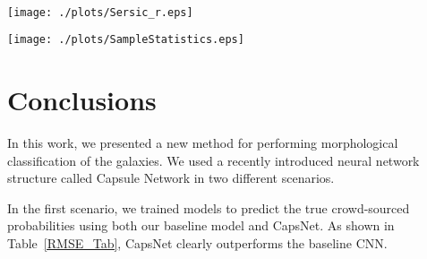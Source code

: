 \documentclass[a4paper,fleqn,usenatbib]{mnras}
\begin{document}
\begin{figure*}
	\centering
 	\hfil 
    \caption{Training and testing accuracy vs number of epochs for classification based on the answers to question one.}
    \label{fig_3_acc}
\end{figure*}

\begin{figure*}
	\centering
 	\hfil 
 	\\[-2ex]  
 	\hfill
 \caption{Original and reconstructed images of the galaxies.}
 \label{Reconst}
\end{figure*}

\begin{figure*}
	\centering
 	\texttt{[image: ./plots/Sersic\_r.eps]} 
    \caption{Estimated S{\'e}rsic index of original images versus reconstructed images.}
    \label{fig_S{\'e}rsic}
\end{figure*}

\begin{figure*}
	\centering
 	\texttt{[image: ./plots/SampleStatistics.eps]} 
    \caption{Mean and 95\% confidence interval of the difference between the estimated S{\'e}rsic index for the original and reconstructed images  ($n_{Original} - n_{Reconstructed} $).}
    \label{fig_stat}
\end{figure*}

\section{Conclusions}

In this work, we presented a new method for performing morphological classification of the galaxies. We used a recently introduced neural network structure called Capsule Network in two different scenarios. 

In the first scenario, we trained models to predict the true crowd-sourced probabilities using both our baseline model and CapsNet. As shown in Table~\ref{RMSE_Tab}, CapsNet clearly outperforms the baseline CNN.
\end{document}
